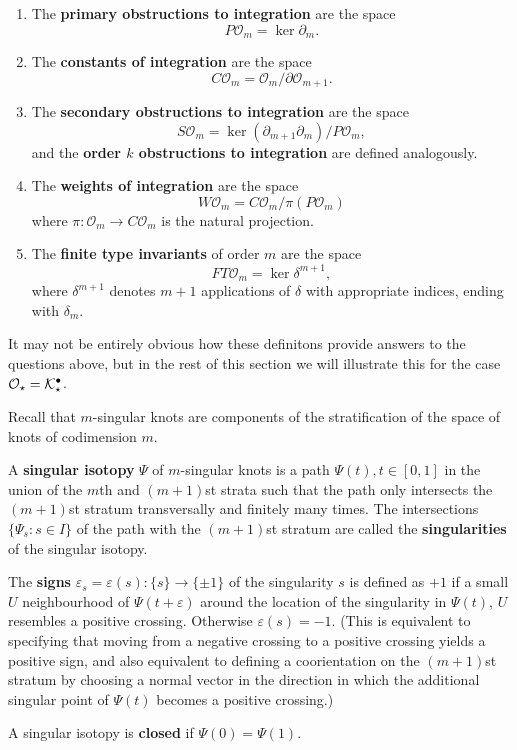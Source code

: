 \begin{definitions}
	\label{def:integration-theory-spaces}
	\begin{enumerate}
		\item The \textbf{primary obstructions to integration} are the space
			\[P\mathcal{O}_{m} = \ker{\partial_{m}}.\]
		\label{subdef:primary-obstructions}
		\item The \textbf{constants of integration} are the space
			\[C\mathcal{O}_{m} = \mathcal{O}_{m} / \partial \mathcal{O}_{m + 1}.\]
		\item The \textbf{secondary obstructions to integration} are the space
			\[S\mathcal{O}_{m} = \ker{(\partial_{m + 1}\partial_{m})} / P\mathcal{O}_{m},\]
			and the \textbf{order \(k\) obstructions to integration} are defined analogously.
		\item The \textbf{weights of integration} are the space
			\[W\mathcal{O}_{m} = C\mathcal{O}_{m} / \pi(P\mathcal{O}_{m})\]
			where \(\pi: \mathcal{O}_{m} \to C\mathcal{O}_{m}\) is the natural projection.
		\item The \textbf{finite type invariants} of order \(m\) are the space
			\[FT\mathcal{O}_{m} = \ker \delta^{m + 1},\]
			where \(\delta^{m + 1}\) denotes \(m + 1\) applications of \(\delta\) with appropriate indices, ending with \(\delta_{m}\).

	\end{enumerate}
\end{definitions}
It may not be entirely obvious how these definitons provide answers to the questions above, but in the rest of this section we will illustrate this for the case \(\mathcal{O}_{\star} = \mathcal{K}^{\bullet}_{\star}\).

Recall that \(m\)-singular knots are components of the stratification of the space of knots of codimension \(m\).

\begin{definition}
	A \textbf{singular isotopy} \(\Psi\) of \(m\)-singular knots is a path \(\Psi(t), t \in [0, 1]\) in the union of the \(m\)th and \((m + 1)\)st strata such that the path only intersects the \((m + 1)\)st stratum transversally and finitely many times. The intersections \(\{\Psi_{s} : s \in I\}\) of the path with the \((m + 1)\)st stratum are called the \textbf{singularities} of the singular isotopy.

	The \textbf{signs} \(\varepsilon_{s} = {\varepsilon(s): \{s\} \to \{\pm 1\}}\) of the singularity \(s\) is defined as \(+1\) if a small \(U\) neighbourhood of \(\Psi(t + \varepsilon)\) around the location of the singularity in \(\Psi(t)\), \(U\) resembles a positive crossing. Otherwise \(\varepsilon(s) = -1\). (This is equivalent to specifying that moving from a negative crossing to a positive crossing yields a positive sign, and also equivalent to defining a coorientation on the \((m + 1)\)st stratum by choosing a normal vector in the direction in which the additional singular point of \(\Psi(t)\) becomes a positive crossing.)

	A singular isotopy is \textbf{closed} if \(\Psi(0) = \Psi(1)\).
\end{definition}

